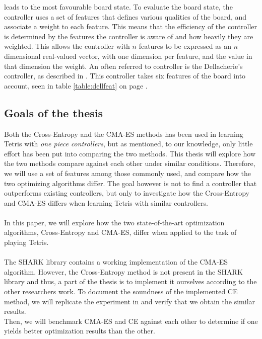 leads to the most favourable board state. To evaluate the board 
state, the controller uses a set of features that defines 
various qualities of the board, and associate a weight to each 
feature. This means that the efficiency of the controller 
is determined by the features the controller is aware of
and how heavily they are weighted. This allows
the controller with $n$ features to be expressed as an 
$n$ dimensional real-valued vector, with one dimension 
per feature, and the value in that dimension the weight.
An often referred to controller is the Dellacherie's controller, 
as described in \cite{scherrer2009}. This controller
takes six features of the board into account, seen in table 
\ref{table:dellfeat} on page \pageref{table:dellfeat}.



\subsection{Goals of the thesis}

Both the Cross-Entropy and the CMA-ES methods has been used 
in learning Tetris with \textit{one piece controllers}, but as 
mentioned, to our knowledge, only little effort has been put into 
comparing the two methods. This thesis will explore
how the two methods compare against each other under similar
conditions. Therefore, we will use a set of features among those
commonly used, and compare how the two optimizing algorithms 
differ. The goal however is not to find a controller that 
outperforms existing controllers, but only to investigate 
how the Cross-Entropy and CMA-ES differs when learning Tetris
with similar controllers.\\
\\
In this paper, we will explore how the two state-of-the-art
optimization algorithms, Cross-Entropy and CMA-ES, differ when 
applied to the task of playing Tetris.\\
\\
The SHARK library \citep{shark08} contains a
working implementation of the CMA-ES 
algorithm. However, the Cross-Entropy method 
is not present in the SHARK library and thus, 
a part of the thesis is to implement it ourselves according to 
the other researchers work. To document the 
soundness of the implemented CE method, 
we will replicate the experiment in \citep{thiery:09} and 
verify that we obtain the similar results.\\
Then, we will benchmark CMA-ES and CE against each other 
to determine if one yields better optimization results than the other.

